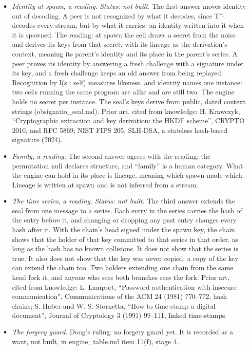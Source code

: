 \begin{itemize}
\item \emph{Identity at spawn, a reading. Status: not built.} The first answer moves identity out of decoding. A peer is not recognized by what it decodes, since T⁻¹ decodes every stream, but by what it carries: an identity written into it when it is spawned. The reading: at spawn the cell draws a secret from the noise and derives its keys from that secret, with its lineage as the derivation's context, meaning its parent's identity and its place in the parent's series. A peer proves its identity by answering a fresh challenge with a signature under its key, and a fresh challenge keeps an old answer from being replayed. Recognition by I(s : self) measures likeness, and identity names one instance: two cells running the same program are alike and are still two. The engine holds no secret per instance. The seal's keys derive from public, dated context strings (obsignatio\_\allowbreak{}seal.md). Prior art, cited from knowledge: H. Krawczyk, “Cryptographic extraction and key derivation: the HKDF scheme”, CRYPTO 2010, and RFC 5869; NIST FIPS 205, SLH-DSA, a stateless hash-based signature (2024).
\item \emph{Family, a reading.} The second answer agrees with the reading: the permutation null declares structure, and “family” is a human category. What the engine can hold in its place is lineage, meaning which spawn made which. Lineage is written at spawn and is not inferred from a stream.
\item \emph{The time series, a reading. Status: not built.} The third answer extends the seal from one message to a series. Each entry in the series carries the hash of the entry before it, and changing or dropping any past entry changes every hash after it. With the chain's head signed under the spawn key, the chain shows that the holder of that key committed to that series in that order, as long as the hash has no known collisions. It does not show that the series is true. It also does not show that the key was never copied: a copy of the key can extend the chain too. Two holders extending one chain from the same head fork it, and anyone who sees both branches sees the fork. Prior art, cited from knowledge: L. Lamport, “Password authentication with insecure communication”, Communications of the ACM 24 (1981) 770–772, hash chains; S. Haber and W. S. Stornetta, “How to time-stamp a digital document”, Journal of Cryptology 3 (1991) 99–111, linked time-stamps.
\item \emph{The forgery guard.} Doug's ruling: no forgery guard yet. It is recorded as a want, not built, in engine\_\allowbreak{}table.md item 11(f), stage 4.
\end{itemize}
